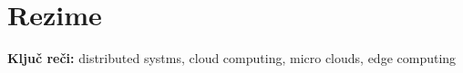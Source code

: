 \chapter*{Rezime}
\pagestyle{plain}
\textbf{Klju\v c re\v ci:} distributed systms, cloud computing, micro clouds, edge computing
